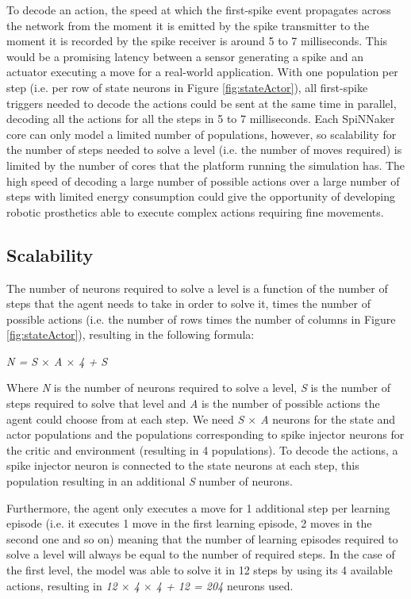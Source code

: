 \documentclass[10pt]{article}
\begin{document}
    To decode an action, the speed at which the first-spike event propagates across the network from the moment it is emitted by the spike transmitter to the moment it is recorded by the spike receiver is around 5 to 7 milliseconds. This would be a promising latency between a sensor generating a spike and an actuator executing a move for a real-world application.  With one population per step (i.e. per row of state neurons in Figure \ref{fig:stateActor}), all first-spike triggers needed to decode the actions could be sent at the same time in parallel, decoding all the actions for all the steps in 5 to 7 milliseconds. Each SpiNNaker core can only model a limited number of populations, however, so scalability for the number of steps needed to solve a level (i.e. the number of moves required) is limited by the number of cores that the platform running the simulation has. The high speed of decoding a large number of possible actions over a large number of steps with limited energy consumption could give the opportunity of developing robotic prosthetics able to execute complex actions requiring fine movements.

    \subsection{Scalability}

    The number of neurons required to solve a level is a function of the number of steps that the agent needs to take in order to solve it, times the number of possible actions (i.e. the number of rows times the number of columns in Figure \ref{fig:stateActor}), resulting in the following formula:

    \begin{center}
        \textit{N = S $\times$ A $\times$ 4 + S}
    \end{center}

    Where \textit{N} is the number of neurons required to solve a level, \textit{S} is the number of steps required to solve that level and \textit{A} is the number of possible actions the agent could choose from at each step. We need \textit{S $\times$ A} neurons for the state and actor populations and the populations corresponding to spike injector neurons for the critic and environment (resulting in 4 populations). To decode the actions, a spike injector neuron is connected to the state neurons at each step, this population resulting in an additional \textit{S} number of neurons.

    Furthermore, the agent only executes a move for 1 additional step per learning episode (i.e. it executes 1 move in the first learning episode, 2 moves in the second one and so on) meaning that the number of learning episodes required to solve a level will always be equal to the number of required steps. In the case of the first level, the model was able to solve it in 12 steps by using its 4 available actions, resulting in \textit{12 $\times$ 4 $\times$ 4 + 12 = 204} neurons used.
\end{document}
